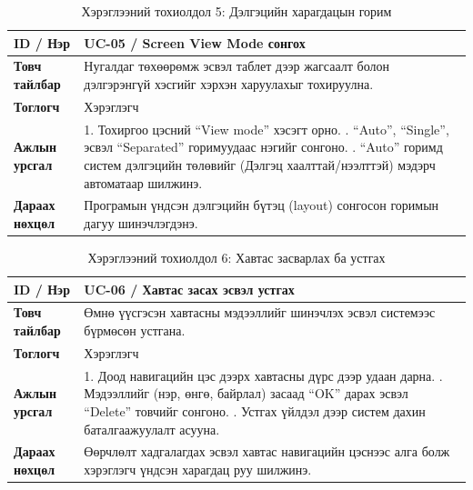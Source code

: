 \vspace{1em}

\begin{longtable}{|l|p{10.5cm}|}
    \caption{Хэрэглээний тохиолдол 5: Дэлгэцийн харагдацын горим} \label{tab:uc_screen_view} \\
    \hline
    \textbf{ID / Нэр} & UC-05 / Screen View Mode сонгох \\ \hline
    \textbf{Товч тайлбар} & Нугалдаг төхөөрөмж эсвэл таблет дээр жагсаалт болон дэлгэрэнгүй хэсгийг хэрхэн харуулахыг тохируулна. \\ \hline
    \textbf{Тоглогч} & Хэрэглэгч \\ \hline
    \textbf{Ажлын урсгал} &
    1. Тохиргоо цэсний ``View mode'' хэсэгт орно. \newline
    2. ``Auto'', ``Single'', эсвэл ``Separated'' горимуудаас нэгийг сонгоно. \newline
    3. ``Auto'' горимд систем дэлгэцийн төлөвийг (Дэлгэц хаалттай/нээлттэй) мэдэрч автоматаар шилжинэ. \\ \hline
    \textbf{Дараах нөхцөл} & Програмын үндсэн дэлгэцийн бүтэц (layout) сонгосон горимын дагуу шинэчлэгдэнэ. \\ \hline
\end{longtable}

\vspace{1em}

\begin{longtable}{|l|p{10.5cm}|}
    \caption{Хэрэглээний тохиолдол 6: Хавтас засварлах ба устгах} \label{tab:uc_edit_folder} \\
    \hline
    \textbf{ID / Нэр} & UC-06 / Хавтас засах эсвэл устгах \\ \hline
    \textbf{Товч тайлбар} & Өмнө үүсгэсэн хавтасны мэдээллийг шинэчлэх эсвэл системээс бүрмөсөн устгана. \\ \hline
    \textbf{Тоглогч} & Хэрэглэгч \\ \hline
    \textbf{Ажлын урсгал} &
    1. Доод навигацийн цэс дээрх хавтасны дүрс дээр удаан дарна. \newline
    2. Мэдээллийг (нэр, өнгө, байрлал) засаад ``OK'' дарах эсвэл ``Delete'' товчийг сонгоно. \newline
    3. Устгах үйлдэл дээр систем дахин баталгаажуулалт асууна. \\ \hline
    \textbf{Дараах нөхцөл} & Өөрчлөлт хадгалагдах эсвэл хавтас навигацийн цэснээс алга болж хэрэглэгч үндсэн харагдац руу шилжинэ. \\ \hline
\end{longtable}
